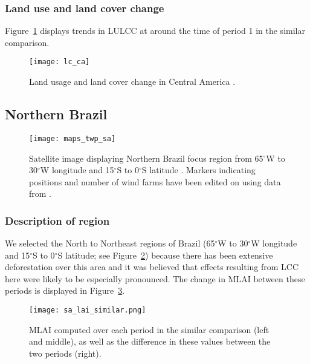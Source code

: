 \subsubsection{Land use and land cover change}

Figure~\ref{fig:lc_ca} displays trends in \ac{LULCC} at around the time of period 1 in the similar comparison.

\begin{figure}[!ht]
	\centering
	\texttt{[image: lc\_ca]}
	\caption[Central America Land Usage]{Land usage and land cover change in Central America \citep{ipcc_2007}.}
	\label{fig:lc_ca}
\end{figure}

\subsection{Northern Brazil}

\begin{figure}[!ht]
	\centering
	\texttt{[image: maps\_twp\_sa]}
	\caption[Northern Brazil Map]{Satellite image displaying Northern Brazil focus region from 65$^\circ$W to 30$^\circ$W longitude and 15$^\circ$S to 0$^\circ$S latitude \citep{maps_sa}. Markers indicating positions and number of wind farms have been edited on using data from \citep{twp_br}.}
	\label{fig:maps_twp_sa}
\end{figure}

\subsubsection{Description of region}

We selected the North to Northeast regions of Brazil (65$^\circ$W to 30$^\circ$W longitude and 15$^\circ$S to 0$^\circ$S latitude; see Figure~\ref{fig:maps_twp_sa}) because there has been extensive deforestation over this area and it was believed that effects resulting from \ac{LCC} here were likely to be especially pronounced. The change in \ac{MLAI} between these periods is displayed in Figure~\ref{fig:sa_lai_similar}.

\begin{figure}[!ht]
	\centering
	\texttt{[image: sa\_lai\_similar.png]}
	\caption[MLAI similar comparison for NB focus region]{\ac{MLAI} computed over each period in the similar comparison (left and middle), as well as the difference in these values between the two periods (right).}
	\label{fig:sa_lai_similar}
\end{figure}

